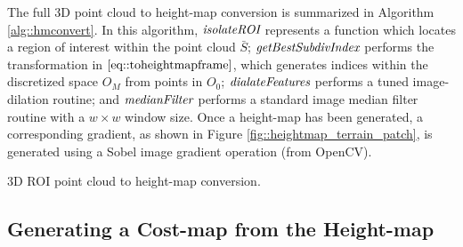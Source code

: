 			The full 3D point cloud to height-map conversion is summarized in Algorithm \ref{alg::hmconvert}. In this algorithm, $\emph{\text{isolateROI}}$ represents a function which locates a region of interest within the point cloud $\bar{S}$; $\emph{\text{getBestSubdivIndex}}$ performs the transformation in $\ref{eq::toheightmapframe}$, which generates indices within the discretized space $O_{M}$ from points in $O_{0}$; $\emph{\text{dialateFeatures}}$ performs a tuned image-dilation routine; and $\emph{\text{medianFilter}}$ performs a standard image median filter routine with a $w\times w$ window size. Once a height-map has been generated, a corresponding gradient, as shown in Figure \ref{fig::heightmap_terrain_patch}, is generated using a Sobel image gradient operation (from OpenCV).
			\begin{algorithm}[!h]
				\begin{algorithmic}
						\EndIf
					\EndFor
				\end{algorithmic}	
				\caption{3D ROI point cloud to height-map conversion.}
				\label{alg::hmconvert}
			\end{algorithm}






		\subsection{Generating a Cost-map from the Height-map}

